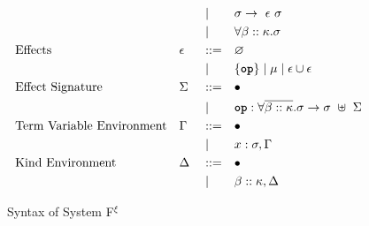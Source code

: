 \begin{figure}[h]
\begin{align*}
         &                                  &  &          &  & \mid &  & \sigma \rightarrow~\epsilon~\sigma                                                                   & \\
         &                                  &  &          &  & \mid &  & \forall \beta :: \kappa. \sigma                                                                      & \\
         & \text{Effects}                   &  & \epsilon &  & ::=  &  & \varnothing                                                                                           & \\
         &                                  &  &          &  & \mid &  & \{\textbf{\texttt{op}}\}\mid\mu\mid\epsilon\cup\epsilon                                             & \\
         & \text{Effect Signature}          &  & \Sigma   &  & ::=  &  & \bullet                                                                                              & \\
         &                                  &  &          &  & \mid &  & \textbf{\texttt{op}}: \forall \overline{\beta :: \kappa}. \sigma \rightarrow \sigma ~\uplus~ \Sigma  & \\
         & \text{Term Variable Environment} &  & \Gamma   &  & ::=  &  & \bullet                                                                                              & \\
         &                                  &  &          &  & \mid &  & x: \sigma, \Gamma                                                                                    & \\
         & \text{Kind Environment}          &  & \Delta   &  & ::=  &  & \bullet                                                                                              & \\
         &                                  &  &          &  & \mid &  & \beta:: \kappa, \Delta                                                                               &
    \end{align*}
    \caption{Syntax of System F$^{\xi}$}
    \label{systemf:syntax}
\end{figure}

